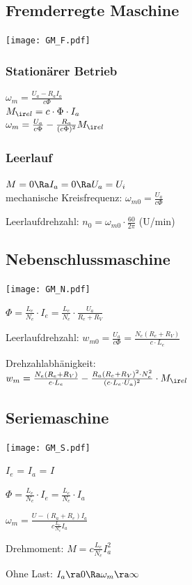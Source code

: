 \documentclass[german]{latex4ei_fs}
\begin{document}
\begin{sectionbox}
\subsection{Fremderregte Maschine}
\texttt{[image: GM\_F.pdf]}

\subsubsection*{Stationärer Betrieb}
$\omega_m =  \frac{U_a - R_a I_a}{c \Phi} $ \\
$M_{\ir el} = c \cdot \Phi \cdot I_a$ \\

$\omega_m = \frac{U_a}{c \Phi} - \frac{R_a}{(c \Phi)^2} M_{\ir el}  $
\subsubsection*{Leerlauf}
 $M = 0 \Ra I_a = 0 \Ra U_a = U_i$ \\
 mechanische Kreisfrequenz: $\omega_{m0} = \frac{U_a}{c \Phi}$

 Leerlaufdrehzahl: $n_0 = \omega_{m0} \cdot \frac{60}{2 \pi}$ (U/min)
\end{sectionbox}
\begin{sectionbox}
\subsection{Nebenschlussmaschine}
\texttt{[image: GM\_N.pdf]}

$\Phi = \frac{L_e}{N_e} \cdot I_e = \frac{L_e}{N_e} \cdot \frac{U_a}{R_e + R_V}$

Leerlaufdrehzahl: $w_{m0} = \frac{U_a}{c \Phi} = \frac{N_e (R_e + R_V)}{c \cdot L_e}$

Drehzahlabhänigkeit:\\ $w_m = \frac{N_e (R_e + R_V)}{c \cdot L_e} - \frac{R_a (R_e + R_V)^2 \cdot N_e^2}{(c \cdot L_e \cdot U_a)^2} \cdot M_{\ir el}$
\end{sectionbox}
\begin{sectionbox}
\subsection{Seriemaschine}
\texttt{[image: GM\_S.pdf]}

$I_e$ = $I_a$ = $I$

$\Phi = \frac{L_e}{N_e} \cdot I_e = \frac{L_e}{N_e} \cdot I_a$

$\omega_m = \frac{U- (R_a + R_e) I_a}{c \frac{L_e}{N_e} I_a}$

Drehmoment: $M = c \frac{L_e}{N_e} I_a^2 $

Ohne Last: $I_a \ra 0 \Ra \omega_m \ra \infty$
\end{sectionbox}
\end{document}
